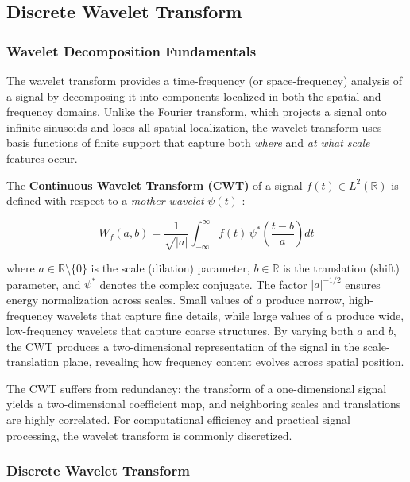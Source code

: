 \subsection{Discrete Wavelet Transform}

\subsubsection{Wavelet Decomposition Fundamentals}

The wavelet transform provides a time-frequency (or space-frequency) analysis of a signal by decomposing it into components localized in both the spatial and frequency domains. Unlike the Fourier transform, which projects a signal onto infinite sinusoids and loses all spatial localization, the wavelet transform uses basis functions of finite support that capture both \textit{where} and \textit{at what scale} features occur.

The \textbf{Continuous Wavelet Transform (CWT)} of a signal $f(t) \in L^2(\mathbb{R})$ is defined with respect to a \textit{mother wavelet} $\psi(t)$ \cite{daubechies1992ten}:

\begin{equation}
    W_f(a, b) = \frac{1}{\sqrt{|a|}} \int_{-\infty}^{\infty} f(t) \, \psi^{*}\!\left(\frac{t - b}{a}\right) dt
\end{equation}

where $a \in \mathbb{R} \setminus \{0\}$ is the scale (dilation) parameter, $b \in \mathbb{R}$ is the translation (shift) parameter, and $\psi^{*}$ denotes the complex conjugate. The factor $|a|^{-1/2}$ ensures energy normalization across scales. Small values of $a$ produce narrow, high-frequency wavelets that capture fine details, while large values of $a$ produce wide, low-frequency wavelets that capture coarse structures. By varying both $a$ and $b$, the CWT produces a two-dimensional representation of the signal in the scale-translation plane, revealing how frequency content evolves across spatial position.

The CWT suffers from redundancy: the transform of a one-dimensional signal yields a two-dimensional coefficient map, and neighboring scales and translations are highly correlated. For computational efficiency and practical signal processing, the wavelet transform is commonly discretized.

\subsubsection{Discrete Wavelet Transform}
\label{sec:dwt}

